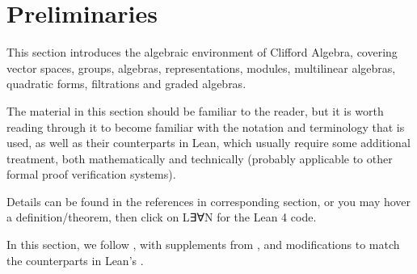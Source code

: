 \section{Preliminaries}
\label{cha:preliminaries}

This section introduces the algebraic environment of Clifford Algebra,
covering vector spaces, groups, algebras, representations, modules, multilinear algebras,
quadratic forms, filtrations and graded algebras.

The material in this section should be familiar to the reader, but it is worth reading
 through it to become familiar with the notation and terminology that is used,
 as well as their counterparts in Lean, which usually require some additional treatment, both
 mathematically and technically (probably applicable to other formal proof verification systems).

Details can be found in the references in corresponding section, or you may hover a definition/theorem,
then click on L∃∀N for the Lean 4 code.

In this section, we follow \cite{jadczyk2019notes}, with supplements from \cite{garling2011clifford, chen2016infinitely}, 
and modifications to match the counterparts in Lean's \Mathlib.

